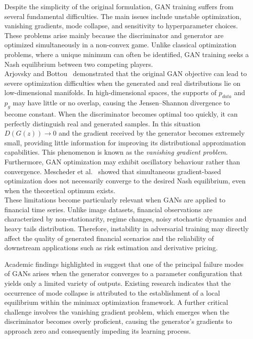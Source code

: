 Despite the simplicity of the original formulation, GAN training suffers from
several fundamental difficulties.
The main issues include unstable optimization, vanishing gradients, mode
collapse, and sensitivity to hyperparameter choices.\\
These problems arise mainly because the discriminator and generator are
optimized simultaneously in a non-convex game.
Unlike classical optimization problems, where a unique minimum can often be
identified, GAN training seeks a Nash equilibrium between two competing
players.\\

Arjovsky and Bottou~\cite{background:gan_train_problems} demonstrated that the original GAN
objective can lead to severe optimization difficulties when the generated and
real distributions lie on low-dimensional manifolds.
In high-dimensional spaces, the supports of $p_{data}$ and $p_g$ may have
little or no overlap, causing the Jensen--Shannon divergence to become
constant.
When the discriminator becomes optimal too quickly, it can perfectly
distinguish real and generated samples. In this situation 
$D(G(z))\rightarrow 0$
and the gradient received by the generator becomes extremely small, providing little information for improving its distributional approximation capabilities.
This phenomenon is known as the \textit{vanishing gradient problem}.\\

Furthermore, GAN optimization may exhibit oscillatory behaviour rather than
convergence.
Mescheder et al.~\cite{background:gan_train_problems2} showed that simultaneous gradient-based
optimization does not necessarily converge to the desired Nash equilibrium,
even when the theoretical optimum exists.\\

These limitations become particularly relevant when GANs are applied to
financial time series. Unlike image datasets, financial observations are characterized by non-stationarity,
 regime changes, noisy stochastic dynamics and heavy tails distribution.
Therefore, instability in adversarial training may directly affect the quality
of generated financial scenarios and the reliability of downstream applications
such as risk estimation and derivative pricing.

Academic findings highlighted in \cite{background:gan_time_series} suggest that one of the principal failure modes of GANs 
arises when the generator converges to a parameter configuration that yields only a limited variety of outputs.
Existing research indicates that the occurrence of mode collapse is attributed to the establishment of a local 
equilibrium within the minimax optimization framework.
A further critical challenge involves the vanishing gradient problem,
which emerges when the discriminator becomes overly proficient,
causing the generator's gradients to approach zero and consequently impeding its learning process.\\


